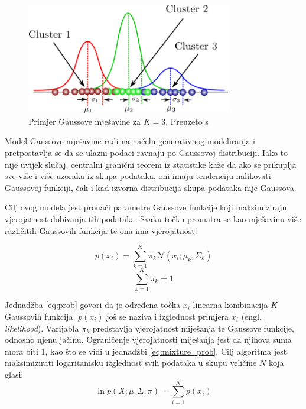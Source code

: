 \documentclass[utf8, diplomski, numeric]{fer}
\begin{document}
\begin{figure}[htb]
\includegraphics[width=0.8\textwidth]{images/gauss_mixture.png}
\centering
\caption{Primjer Gaussove mješavine za $K = 3$. Preuzeto s  \cite{GaussianMixtureExplained}}
\label{fig:gauss-mixture}
\end{figure}

Model Gaussove mješavine radi na načelu generativnog modeliranja i pretpostavlja se da se ulazni podaci ravnaju po Gaussovoj distribuciji. Iako to nije uvijek slučaj, centralni granični teorem iz statistike kaže da ako se prikuplja sve više i više uzoraka iz skupa podataka, oni imaju tendenciju nalikovati Gaussovoj funkciji, čak i kad izvorna distribucija skupa podataka nije Gaussova.

Cilj ovog modela jest pronaći parametre Gaussove funkcije koji maksimiziraju vjerojatnost dobivanja tih podataka. Svaku točku promatra se kao mješavinu više različitih Gaussovih funkcija te ona ima vjerojatnost:

\begin{equation}\label{eq:prob}
p(x_i) = \sum_{k=1}^{K}\pi_k \mathcal{N}(x_i;\mu_k,\Sigma_k)
\end{equation}
\begin{equation}\label{eq:mixture_prob}
\sum_{k=1}^{K}\pi_k  = 1
\end{equation}

Jednadžba \ref{eq:prob} govori da je određena točka $x_i$ linearna kombinacija $K$ Gaussovih funkcija. $p(x_i)$ još se naziva i izglednost primjera $x_i$ (engl. \textit{likelihood}). Varijabla $\pi_k$ predstavlja vjerojatnost miješanja te Gaussove funkcije, odnosno njenu jačinu. Ograničenje vjerojatnosti miješanja jest da njihova suma mora biti 1, kao što se vidi u jednadžbi \ref{eq:mixture_prob}. Cilj algoritma jest maksimizirati logaritamsku izglednost svih podataka u skupu veličine $N$ koja glasi:
\begin{equation}\label{eg:likelihood}
\ln p(X; \mu, \Sigma, \pi) = \sum_{i=1}^{N} p(x_i)
 \end{equation}
\end{document}
